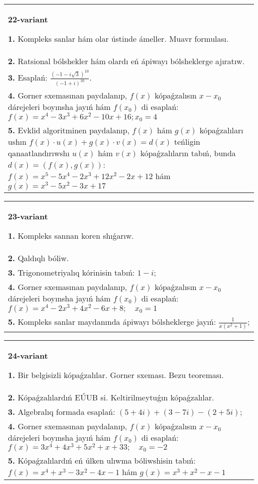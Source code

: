 \documentclass{article}
\begin{document}
\begin{tabular}{m{17cm}}
\textbf{22-variant}
\newline

\textbf{1.} Kompleks sanlar hám olar ústinde ámeller. Muavr formulası.  \\
\textbf{2.} Ratsional bólshekler hám olardı eń ápiwayı bólsheklerge ajıratıw. \\
\textbf{3.} Esaplań:  $\frac{(-1-i \sqrt{3})^{10}}{(-1+i)^{16}}$. \\
\textbf{4.} Gorner sxemasınan paydalanıp, $f(x)$ kópaǵzalısın $x-x_0$ dárejeleri boyınsha jayıń hám $f\left(x_0\right)$ di esaplań: $f(x)=x^4-3 x^3+6 x^2-10 x+16 ; x_0=4$ \\
\textbf{5.} Evklid algoritminen paydalanıp, $f(x)$ hám $g(x)$ kópaǵzalıları ushın $f(x) \cdot u(x)+g(x) \cdot v(x)=d(x)$ teńligin qanaatlandırıwshı $u(x)$ hám $v(x)$ kópaǵzalıların tabıń, bunda $d(x)=(f(x), g(x))$:  $f(x)=x^5-5 x^4-2 x^3+12 x^2-2 x+12$ hám $g(x)=x^3-5 x^2-3 x+17$ \\

\end{tabular}
\vspace{1cm}


\begin{tabular}{m{17cm}}
\textbf{23-variant}
\newline

\textbf{1.} Kompleks sannan koren shıǵarıw. \\
\textbf{2.} Qaldıqlı bóliw.  \\
\textbf{3.} Trigonometriyalıq kórinisin tabıń: $1-i$; \\
\textbf{4.} Gorner sxemasınan paydalanıp, $f(x)$ kópaǵzalısın $x-x_0$ dárejeleri boyınsha jayıń hám $f\left(x_0\right)$ di esaplań: $f(x)=x^4-2 x^3+4 x^2-6 x+8 ; \quad x_0=1$ \\
\textbf{5.} Kompleks sanlar maydanında ápiwayı bólsheklerge jayıń: $\frac{1}{x\left(x^2+1\right)}$; \\

\end{tabular}
\vspace{1cm}


\begin{tabular}{m{17cm}}
\textbf{24-variant}
\newline

\textbf{1.} Bir belgisizli kópaǵzalılar. Gorner sxeması. Bezu teoreması.  \\
\textbf{2.} Kópaǵzalılardıń EÚUB si. Keltirilmeytuǵın   kópaǵzalılar. \\
\textbf{3.} Algebralıq formada esaplań: $(5+4 i)+(3-7 i)-(2+5 i)$; \\
\textbf{4.} Gorner sxemasınan paydalanıp, $f(x)$ kópaǵzalısın $x-x_0$ dárejeleri boyınsha jayıń hám $f\left(x_0\right)$ di esaplań: $f(x)=3 x^4+4 x^3+5 x^2+x+33 ; \quad x_0=-2$ \\
\textbf{5.} Kópaǵzalılardıń eń úlken ulıwma bóliwshisin tabıń:  $f(x)=x^4+x^3-3 x^2-4 x-1$ hám $g(x)=x^3+x^2-x-1$ \\

\end{tabular}
\vspace{1cm}
\end{document}
